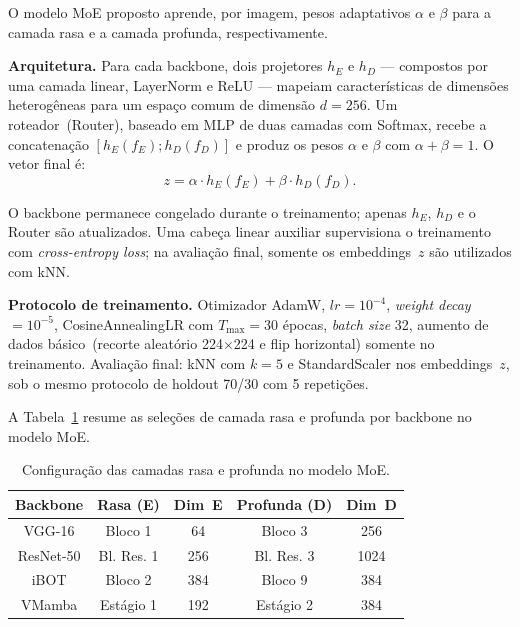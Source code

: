 \documentclass[letterpaper, 10 pt, conference]{ieeeconf}
\begin{document}
O modelo MoE proposto aprende, por imagem, pesos adaptativos $\alpha$ e
$\beta$ para a camada rasa e a camada profunda, respectivamente.

\textbf{Arquitetura.} Para cada backbone, dois projetores $h_E$ e $h_D$
— compostos por uma camada linear, LayerNorm e ReLU — mapeiam
características de dimensões heterogêneas para um espaço comum de dimensão
$d = 256$.
Um roteador~(Router), baseado em MLP de duas camadas com Softmax, recebe
a concatenação $[h_E(f_E) ; h_D(f_D)]$ e produz os pesos $\alpha$ e
$\beta$ com $\alpha + \beta = 1$.
O vetor final é:
\begin{equation}
    z = \alpha \cdot h_E(f_E) + \beta \cdot h_D(f_D).
    \label{eq:moe}
\end{equation}

O backbone permanece congelado durante o treinamento; apenas $h_E$, $h_D$
e o Router são atualizados.
Uma cabeça linear auxiliar supervisiona o treinamento com
\emph{cross-entropy loss}; na avaliação final, somente os embeddings~$z$
são utilizados com kNN.

\textbf{Protocolo de treinamento.}
Otimizador AdamW, $lr = 10^{-4}$, \emph{weight decay} $= 10^{-5}$,
CosineAnnealingLR com $T_{\max} = 30$ épocas, \emph{batch size} 32,
aumento de dados básico~(recorte aleatório 224$\times$224 e flip
horizontal) somente no treinamento.
Avaliação final: kNN com $k = 5$ e StandardScaler nos embeddings~$z$,
sob o mesmo protocolo de holdout 70/30 com 5 repetições.

A Tabela~\ref{tab_moe_config} resume as seleções de camada rasa e profunda
por backbone no modelo MoE.

\begin{table}[htbp]
\caption{Configuração das camadas rasa e profunda no modelo MoE.}
\begin{center}
\begin{tabular}{c|c|c|c|c}
\hline
\textbf{Backbone} & \textbf{Rasa (E)} & \textbf{Dim~E}
                  & \textbf{Profunda (D)} & \textbf{Dim~D} \\
\hline
VGG-16     & Bloco 1       & 64   & Bloco 3       & 256  \\
ResNet-50  & Bl. Res. 1    & 256  & Bl. Res. 3    & 1024 \\
iBOT       & Bloco 2       & 384  & Bloco 9       & 384  \\
VMamba     & Estágio 1     & 192  & Estágio 2     & 384  \\
\hline
\end{tabular}
\label{tab_moe_config}
\end{center}
\end{table}
\end{document}
